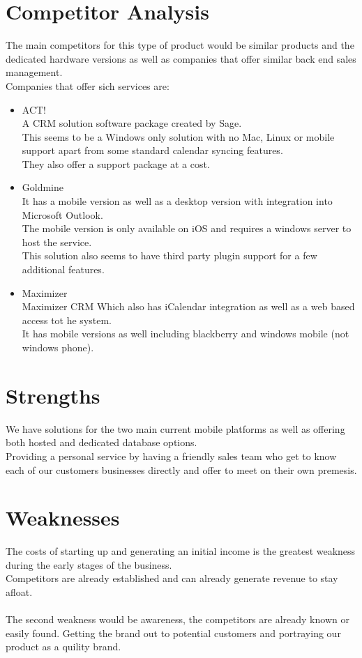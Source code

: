 \documentclass{article}
\begin{document}
\section{Competitor Analysis}
The main competitors for this type of product would be similar products and the dedicated hardware versions as well as companies that offer similar back end sales management.
\\Companies that offer sich services are:
\begin{itemize}
\item ACT!
\\A CRM solution software package created by Sage.
\\This seems to be a Windows only solution with no Mac, Linux or mobile support apart from some standard calendar syncing features.
\\They also offer a support package at a cost.

\item Goldmine
\\It has a mobile version as well as a desktop version with integration into Microsoft Outlook.
\\The mobile version is only available on iOS and requires a windows server to host the service.
\\This solution also seems to have third party plugin support for a few additional features.

\item Maximizer
\\Maximizer CRM Which also has iCalendar integration as well as a web based access tot he system.
\\It has mobile versions as well including blackberry and windows mobile (not windows phone).

\end{itemize}



\section{Strengths}
We have solutions for the two main current mobile platforms as well as offering both hosted and dedicated database options.
\\Providing a personal service by having a friendly sales team who get to know each of our customers businesses directly and offer to meet on their own premesis.

\section{Weaknesses}
The costs of starting up and generating an initial income is the greatest weakness during the early stages of the business.
\\Competitors are already established and can already generate revenue to stay afloat.
\\\\The second weakness would be awareness, the competitors are already known or easily found.  Getting the brand out to potential customers and portraying our product as a quility brand.
\end{document}
